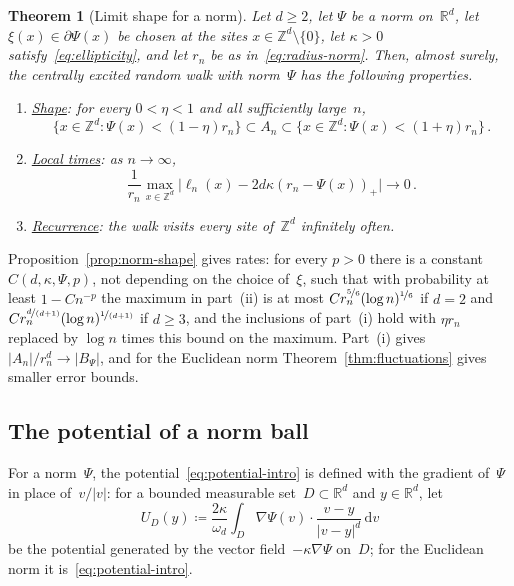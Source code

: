 \documentclass[11pt]{amsart}
\theoremstyle{plain}
\newtheorem{theorem}{Theorem}[section]
\theoremstyle{definition}
\newcommand{\Z}{\mathbb Z}
\newcommand{\R}{\mathbb R}
\newcommand{\drift}{\kappa}
\newcommand{\gauge}{\Psi}
\newcommand{\dd}{\,\mathrm d}
\newcommand{\nf}{\nicefrac}
\numberwithin{equation}{section}
\begin{document}
\begin{theorem}[Limit shape for a norm]\label{thm:norm-shape}
Let $d\geq2$, let $\gauge$ be a norm on~$\R^d$, let $\xi(x)\in\partial \gauge(x)$ be chosen at the sites $x\in\Z^d\setminus\{0\}$, let $\drift>0$ satisfy~\eqref{eq:ellipticity}, and let $r_n$ be as in~\eqref{eq:radius-norm}. Then, almost surely, the centrally excited random walk with norm~$\gauge$ has the following properties.
\begin{enumerate}[label=\textup{(\roman*)}]
\item \underline{\emph{Shape}}: for every $0<\eta<1$ and all sufficiently large~$n$,
\begin{equation*}
\{x\in\Z^d:\gauge(x)<(1-\eta)r_n\}\subset A_n\subset\{x\in\Z^d:\gauge(x)<(1+\eta)r_n\}\, .
\end{equation*}
\item \underline{\emph{Local times}}: as $n\to\infty$,
\begin{equation*}
\frac1{r_n}\max_{x\in\Z^d}\bigl|\ell_n(x)-2d\drift(r_n-\gauge(x))_+\bigr|\longrightarrow0\, .
\end{equation*}
\item \underline{\emph{Recurrence}}: the walk visits every site of~$\Z^d$ infinitely often.
\end{enumerate}
\end{theorem}

Proposition~\ref{prop:norm-shape} gives rates: for every $p>0$ there is a constant $C(d,\drift,\gauge,p)$, not depending on the choice of~$\xi$, such that with probability at least $1-Cn^{-p}$ the maximum in part~(ii) is at most $Cr_n^{\nf56}(\log n)^{\nf16}$ if $d=2$ and $Cr_n^{\nf{d}{(d+1)}}(\log n)^{\nf{1}{(d+1)}}$ if $d\geq3$, and the inclusions of part~(i) hold with $\eta r_n$ replaced by $\log n$ times this bound on the maximum. Part~(i) gives $|A_n|/r_n^d\to|B_\gauge|$, and for the Euclidean norm Theorem~\ref{thm:fluctuations} gives smaller error bounds.

\subsection{The potential of a norm ball}\label{sec:ballpotential}

For a norm~$\gauge$, the potential~\eqref{eq:potential-intro} is defined with the gradient of~$\gauge$ in place of~$v/|v|$: for a bounded measurable set~$D\subset\R^d$ and $y\in\R^d$, let
\begin{equation}\label{eq:potential-norm}
U_D(y)\coloneqq\frac{2\drift}{\omega_d}\int_D\nabla\gauge(v)\cdot\frac{v-y}{|v-y|^d}\dd v
\end{equation}
be the potential generated by the vector field~$-\drift\nabla\gauge$ on~$D$; for the Euclidean norm it is~\eqref{eq:potential-intro}.
\end{document}
